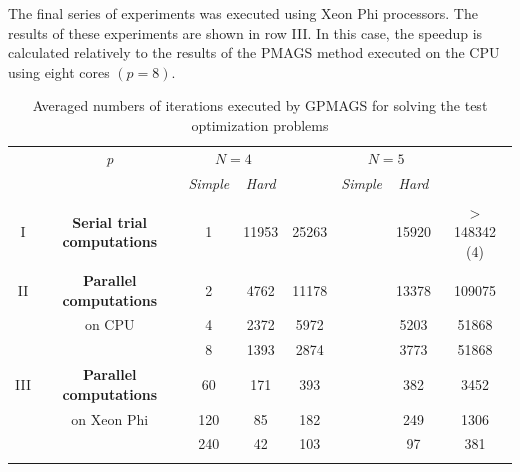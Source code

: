 \documentclass{aims}
\theoremstyle{definition}
\begin{document}
The final series of experiments was executed using Xeon Phi processors. The results
of these experiments are shown in row III. In this case, the speedup is
calculated relatively to the results of the PMAGS method executed on the CPU using eight cores \((p=8)\).

\begin{table}
  \centering
  \caption{Averaged numbers of iterations executed by GPMAGS for solving the test optimization problems}
  \label{tab:4}
  \begin{tabular}{cccccccc}
    \cline{3-8}\noalign{\smallskip}
    \multicolumn{2}{c}{  } & \textit{p} & \multicolumn{2}{c}{$N=4$} & & \multicolumn{2}{c}{$N=5$}   \\
    \noalign{\smallskip} \cline{4-5} \cline{7-8}  \noalign{\smallskip}
    \multicolumn{2}{c}{  } & & \textit{Simple} & \textit{Hard} & & \textit{Simple} & \textit{Hard}  \\
    \noalign{\smallskip}\hline
    I &
    \parbox{0.25\textwidth}{
    \begin{center}
    \textbf{Serial trial computations}
    \end{center}		}
      & 1 & 11953 & 25263 & & 15920 & \(>\)148342 (4)  \\
    \hline \noalign{\smallskip}
II  & \textbf{Parallel computations}  %
  & 2 & 4762 & 11178 & & 13378 & 109075 \\
& on CPU & 4 & 2372 & 5972 & & 5203 & 51868 \\
&  & 8 & 1393 & 2874 & & 3773 & 51868 \\
    \noalign{\smallskip}\hline	\noalign{\smallskip}
III & \textbf{Parallel computations} %
  & 60  & 171 & 393 & & 382 & 3452  \\
& on Xeon Phi  & 120 & 85 & 182 & & 249 & 1306 \\
&  & 240 & 42 & 103 & & 97 & 381 \\

    \noalign{\smallskip}\hline
  \end{tabular}
\end{table}
\end{document}
